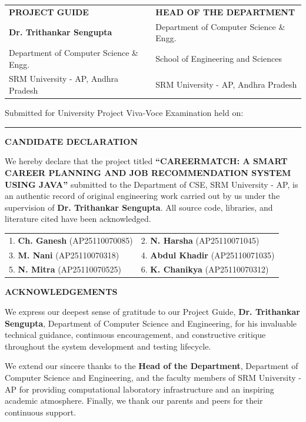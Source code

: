 \documentclass[11pt,a4paper]{report}
\begin{document}
\vspace{1.8cm}
\noindent
\begin{tabular}{p{7.5cm}p{7.5cm}}
\textbf{PROJECT GUIDE} & \textbf{HEAD OF THE DEPARTMENT} \\
\textbf{Dr. Trithankar Sengupta} & Department of Computer Science \& Engg. \\
Department of Computer Science \& Engg. & School of Engineering and Sciences \\
SRM University - AP, Andhra Pradesh & SRM University - AP, Andhra Pradesh \\
\end{tabular}

\vspace{0.8cm}
\noindent Submitted for University Project Viva-Voce Examination held on: \rule{5cm}{0.5pt}

\newpage
\thispagestyle{plain}
\begin{center}
    {\large \textbf{CANDIDATE DECLARATION}}\\[0.2cm]
\end{center}
{\small
We hereby declare that the project titled \textbf{``CAREERMATCH: A SMART CAREER PLANNING AND JOB RECOMMENDATION SYSTEM USING JAVA''} submitted to the Department of CSE, SRM University - AP, is an authentic record of original engineering work carried out by us under the supervision of \textbf{Dr. Trithankar Sengupta}. All source code, libraries, and literature cited have been acknowledged.
}

\vspace{0.3cm}
\noindent
\begin{tabular}{p{7.5cm}p{7.5cm}}
{\footnotesize 1. \textbf{Ch. Ganesh} (AP25110070085)} & {\footnotesize 2. \textbf{N. Harsha} (AP25110071045)} \\
{\footnotesize 3. \textbf{M. Nani} (AP25110070318)} & {\footnotesize 4. \textbf{Abdul Khadir} (AP25110071035)} \\
{\footnotesize 5. \textbf{N. Mitra} (AP25110070525)} & {\footnotesize 6. \textbf{K. Chanikya} (AP25110070312)} \\
\end{tabular}

\vspace{0.5cm}
\begin{center}
    {\large \textbf{ACKNOWLEDGEMENTS}}\\[0.2cm]
\end{center}
{\small
We express our deepest sense of gratitude to our Project Guide, \textbf{Dr. Trithankar Sengupta}, Department of Computer Science and Engineering, for his invaluable technical guidance, continuous encouragement, and constructive critique throughout the system development and testing lifecycle.

We extend our sincere thanks to the \textbf{Head of the Department}, Department of Computer Science and Engineering, and the faculty members of SRM University - AP for providing computational laboratory infrastructure and an inspiring academic atmosphere. Finally, we thank our parents and peers for their continuous support.
}
\end{document}
